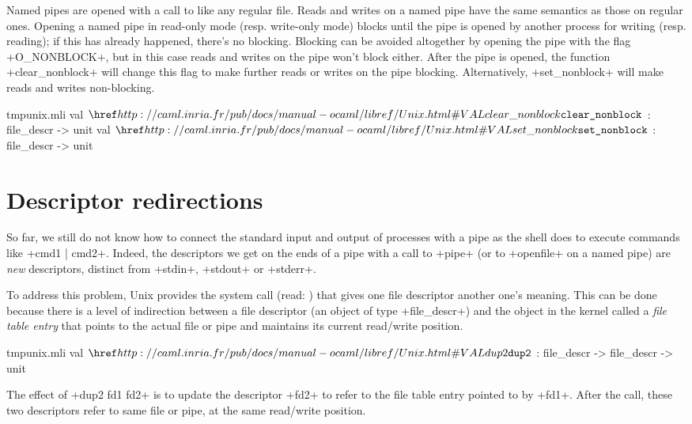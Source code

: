Named pipes are opened with a call to  like any
regular file. Reads and writes on a named pipe have the same semantics
as those on regular ones. Opening a named pipe in read-only mode
(resp. write-only mode) blocks until the pipe is opened by another
process for writing (resp. reading); if this has already happened,
there's no blocking. Blocking can be avoided altogether by opening the
pipe with the flag \ml+O_NONBLOCK+, but in this case reads and writes
on the pipe won't block either. After the
pipe is opened, the function \ml+clear_nonblock+ will change this flag to make further
reads or writes on the pipe blocking. Alternatively,
\ml+set_nonblock+ will make reads and writes non-blocking.
%
\begin{listingcodefile}{tmpunix.mli}
val $\indexlibvalue{Unix}{clear\_nonblock}$ : file_descr -> unit
val $\indexlibvalue{Unix}{set\_nonblock}$ : file_descr -> unit
\end{listingcodefile}

\section{Descriptor redirections}

So far, we still do not know how to connect the standard input and
output of processes with a pipe as the shell does to execute
commands like \ml+cmd1 | cmd2+. Indeed, the descriptors we get on the
ends of a pipe with a call to \ml+pipe+ (or to \ml+openfile+ on a
named pipe) are \emph{new} descriptors, distinct from \ml+stdin+,
\ml+stdout+ or \ml+stderr+.

To address this problem, Unix provides the  system call
(read: ) that gives one file descriptor another one's meaning.
This
can be done because there is a level of indirection between a file
descriptor (an object of type \ml+file_descr+) and the object in the
kernel called a \emph{file table entry} that points to the actual
file or pipe and maintains its current read/write position.
%
\begin{listingcodefile}{tmpunix.mli}
val $\libvalue{Unix}{dup2}$ : file_descr -> file_descr -> unit
\end{listingcodefile}
%
The effect of \ml+dup2 fd1 fd2+ is to update the descriptor \ml+fd2+ to refer to
the file table entry pointed to by \ml+fd1+. After the call, these two
descriptors refer to same file or pipe, at the same read/write
position.


